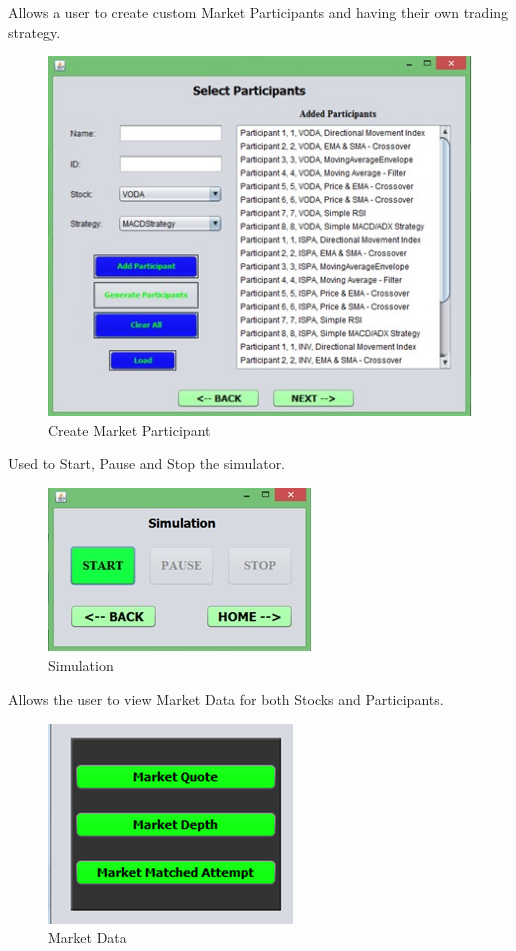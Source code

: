 \documentclass[12pt]{article}
\begin{document}
    Allows a user to create custom Market Participants and having their own trading strategy.

            
		\begin{figure}[h!]
		\centering
		\includegraphics[scale=0.8]{addparticipants}
		\caption{Create Market Participant}
		\label{Create Market Participant}
		\end{figure}

    Used to Start, Pause and Stop the simulator.

\pagebreak            
\begin{figure}[h!]
\centering
\includegraphics[scale=0.8]{simulation}
\caption{Simulation}
\label{Simulation}
\end{figure}

Allows the user to view Market Data for both Stocks and Participants.

\begin{figure}[h!]
\centering
\includegraphics[scale=0.8]{marketdata}
\caption{Market Data}
\label{Market Data}
\end{figure}
        
\end{document}
